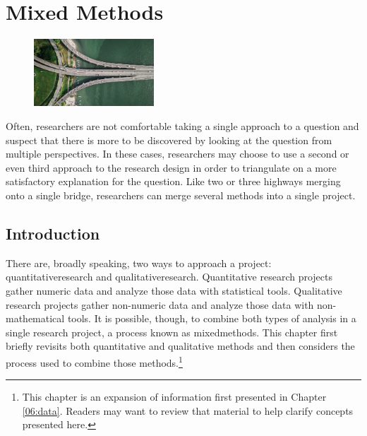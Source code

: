 \chapter{Mixed Methods}\label{ch14:mixed}

\begin{figure}
	\centering
	\includegraphics[width=0.4\textwidth]{gfx/14-intersection} 
\end{figure}

Often, researchers are not comfortable taking a single approach to a question and suspect that there is more to be discovered by looking at the question from multiple perspectives. In these cases, researchers may choose to use a second or even third approach to the research design in order to triangulate on a more satisfactory explanation for the question. Like two or three highways merging onto a single bridge, researchers can merge several methods into a single project.

\section{Introduction}

There are, broadly speaking, two ways to approach a project: \gls{quantitativeresearch} and \gls{qualitativeresearch}. Quantitative research projects gather numeric data and analyze those data with statistical tools. Qualitative research projects gather non-numeric data and analyze those data with non-mathematical tools. It is possible, though, to combine both types of analysis in a single research project, a process known as \gls{mixedmethods}. This chapter first briefly revisits both quantitative and qualitative methods and then considers the process used to combine those methods.\footnote{This chapter is an expansion of information first presented in Chapter \ref{06:data}. Readers may want to review that material to help clarify concepts presented here.}

